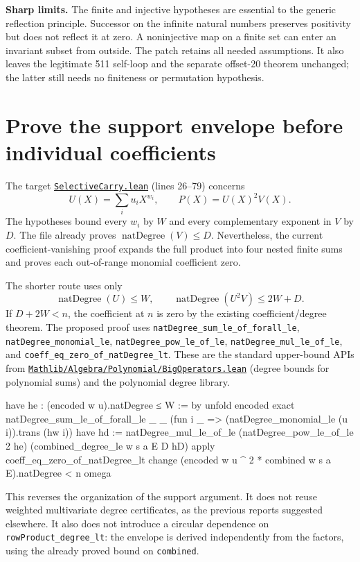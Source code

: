 \documentclass[11pt,letterpaper]{article}
\newcommand{\code}[1]{\nolinkurl{#1}}
\newcommand{\src}[2]{\href{https://github.com/VladimirReshetnikov/ProveIt/blob/e73fa2e916c9bb6f61c79e4fe2cd02b5f43e9d11/Computability/DiophantineConsistency/Lean/DiophantineConsistency/#1.lean}{\nolinkurl{#1.lean}} (lines #2)}
\newcommand{\mathsrc}[2]{\href{https://github.com/leanprover-community/mathlib4/blob/81a5d257c8e410db227a6665ed08f64fea08e997/Mathlib/#1.lean}{\nolinkurl{Mathlib/#1.lean}} (#2)}
\begin{document}
\textbf{Sharp limits.} The finite and injective hypotheses are essential to the generic reflection principle. Successor on the infinite natural numbers preserves positivity but does not reflect it at zero. A noninjective map on a finite set can enter an invariant subset from outside. The patch retains all needed assumptions. It also leaves the legitimate 511 self-loop and the separate offset-20 theorem unchanged; the latter still needs no finiteness or permutation hypothesis.

\section{Prove the support envelope before individual coefficients}

The target \src{SelectiveCarry}{26--79} concerns
\[
 U(X)=\sum_i u_iX^{w_i},\qquad P(X)=U(X)^2V(X).
\]
The hypotheses bound every \(w_i\) by \(W\) and every complementary exponent in \(V\) by \(D\). The file already proves \(\operatorname{natDegree}(V)\le D\). Nevertheless, the current coefficient-vanishing proof expands the full product into four nested finite sums and proves each out-of-range monomial coefficient zero.

The shorter route uses only
\[
 \operatorname{natDegree}(U)\le W,
 \qquad \operatorname{natDegree}(U^2V)\le 2W+D.
\]
If \(D+2W<n\), the coefficient at \(n\) is zero by the existing coefficient/degree theorem. The proposed proof uses \code{natDegree_sum_le_of_forall_le}, \code{natDegree_monomial_le}, \code{natDegree_pow_le_of_le}, \code{natDegree_mul_le_of_le}, and \code{coeff_eq_zero_of_natDegree_lt}. These are the standard upper-bound APIs from \mathsrc{Algebra/Polynomial/BigOperators}{degree bounds for polynomial sums} and the polynomial degree library.

\begin{Lean}
have he : (encoded w u).natDegree ≤ W := by
  unfold encoded
  exact natDegree_sum_le_of_forall_le _ _
    (fun i _ => (natDegree_monomial_le (u i)).trans (hw i))
have hd := natDegree_mul_le_of_le (natDegree_pow_le_of_le 2 he)
  (combined_degree_le w s a E D hD)
apply coeff_eq_zero_of_natDegree_lt
change (encoded w u ^ 2 * combined w s a E).natDegree < n
omega
\end{Lean}

This reverses the organization of the support argument. It does not reuse weighted multivariate degree certificates, as the previous reports suggested elsewhere. It also does not introduce a circular dependence on \code{rowProduct_degree_lt}: the envelope is derived independently from the factors, using the already proved bound on \code{combined}.
\end{document}
